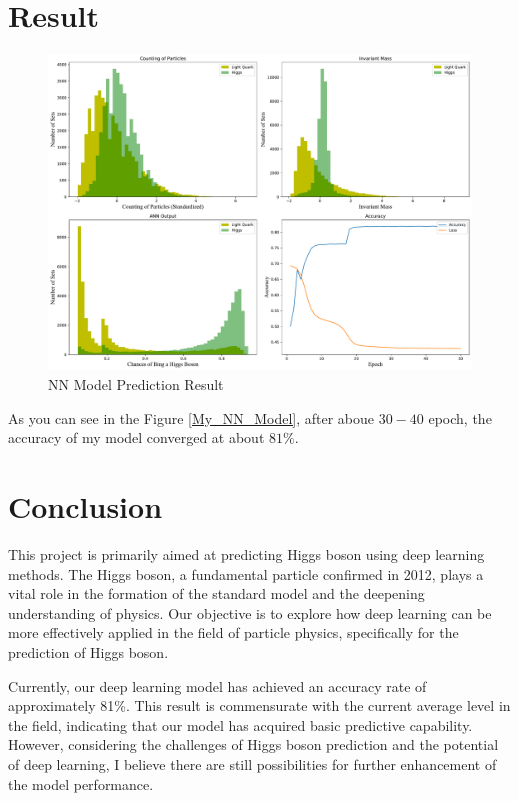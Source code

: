 \documentclass[a4paper,12pt, oneside]{article}
\begin{document}
\section{Result}
\begin{figure}[H]
\centering
\includegraphics[width = 6in]{Result.pdf}
\caption{NN Model Prediction Result}\label{LHC_Computer_Simulation}
\end{figure}

As you can see in the Figure \ref{My_NN_Model}, after aboue $30-40$ epoch, the accuracy of my model converged at about $81\%$.
%
\newpage
\section{Conclusion}
This project is primarily aimed at predicting Higgs boson using deep learning methods. The Higgs boson, a fundamental particle confirmed in 2012, plays a vital role in the formation of the standard model and the deepening understanding of physics. Our objective is to explore how deep learning can be more effectively applied in the field of particle physics, specifically for the prediction of Higgs boson.

Currently, our deep learning model has achieved an accuracy rate of approximately 81\%. This result is commensurate with the current average level in the field, indicating that our model has acquired basic predictive capability. However, considering the challenges of Higgs boson prediction and the potential of deep learning, I believe there are still possibilities for further enhancement of the model performance.
\end{document}
